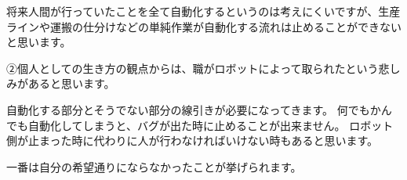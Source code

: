 \documentclass[11pt,a4paper]{jsarticle}
\begin{document}
将来人間が行っていたことを全て自動化するというのは考えにくいですが、生産ラインや運搬の仕分けなどの単純作業が自動化する流れは止めることができないと思います。

②個人としての生き方の観点からは、職がロボットによって取られたという悲しみがあると思います。

自動化する部分とそうでない部分の線引きが必要になってきます。
何でもかんでも自動化してしまうと、バグが出た時に止めることが出来ません。
ロボット側が止まった時に代わりに人が行わなければいけない時もあると思います。

一番は自分の希望通りにならなかったことが挙げられます。
\end{document}
